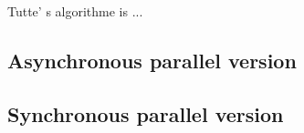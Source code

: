 Tutte' s algorithme is ...


\subsection{Asynchronous parallel version}



\subsection{Synchronous parallel version}

